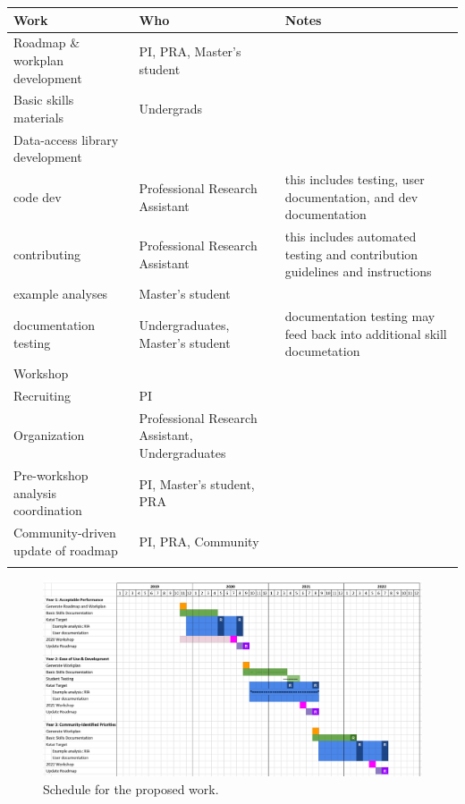 \begin{tabularx}{\textwidth}{XXX}
Work & Who & Notes \\
\toprule
Roadmap \& workplan development
& PI, PRA, Master's student
& \\

Basic skills materials 
& Undergrads
&  \\

Data-access library development
& 
& \\
code dev
& Professional Research Assistant
& this includes testing, user documentation, and dev documentation\\
contributing
& Professional Research Assistant
& this includes automated testing and contribution guidelines and instructions \\
example analyses
& Master's student
& \\
documentation testing
& Undergraduates, Master's student
& documentation testing may feed back into additional skill documetation \\

Workshop
& 
& \\
Recruiting
& PI
& \\
Organization
& Professional Research Assistant, Undergraduates
& \\
Pre-workshop analysis coordination
& PI, Master's student, PRA
& \\

Community-driven update of roadmap
& PI, PRA, Community
& \\
\label{tab:WBS}
\end{tabularx}

\begin{figure}[htb]
    \begin{center}
      \includegraphics[width=\textwidth]{Figures/schedule1}
    \end{center}
    \caption{Schedule for the proposed work.}
    \label{fig:ops-schedule}
\end{figure}
